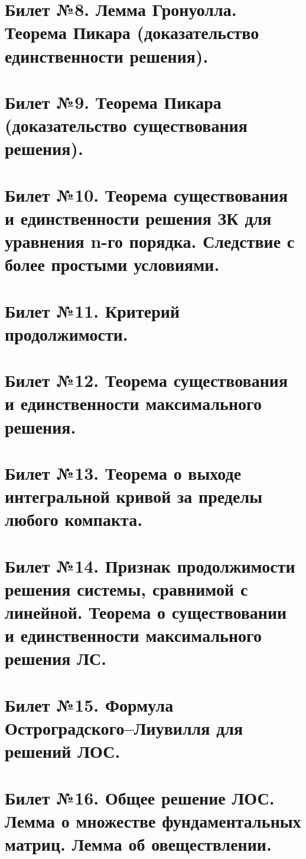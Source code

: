 \documentclass{article}
\begin{document}
\section{Билет №8. Лемма Гронуолла. Теорема Пикара (доказательство единственности решения).}


\section{Билет №9. Теорема Пикара (доказательство существования решения).}


\section{Билет №10. Теорема существования и единственности решения ЗК для уравнения n-го
порядка. Следствие с более простыми условиями.}


\section{Билет №11. Критерий продолжимости.}


\section{Билет №12. Теорема существования и единственности максимального решения.}


\section{Билет №13. Теорема о выходе интегральной кривой за пределы любого компакта.}


\section{Билет №14. Признак продолжимости решения системы, сравнимой с линейной. Теорема о существовании и единственности максимального решения ЛС.}


\section{Билет №15. Формула Остроградского–Лиувилля для решений ЛОС.}


\section{Билет №16. Общее решение ЛОС. Лемма о множестве фундаментальных матриц. Лемма об овеществлении.}

\end{document}
